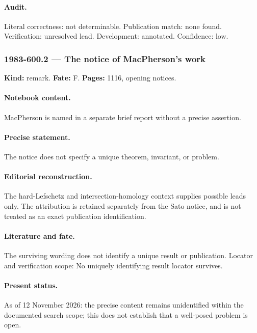 \paragraph{Audit.} Literal correctness: not determinable. Publication match: none found. Verification: unresolved lead. Development: annotated. Confidence: low.

\subsubsection{1983-600.2 --- The notice of MacPherson's work}

\label{item:1983-600.2}

\noindent\textbf{Kind:} remark. \textbf{Fate:} F. \textbf{Pages:} 1116, opening notices.\par

\paragraph{Notebook content.} MacPherson is named in a separate brief report without a precise assertion.

\paragraph{Precise statement.} The notice does not specify a unique theorem, invariant, or problem.

\paragraph{Editorial reconstruction.} The hard-Lefschetz and intersection-homology context supplies possible leads only. The attribution is retained separately from the Sato notice, and is not treated as an exact publication identification.

\paragraph{Literature and fate.} The surviving wording does not identify a unique result or publication. Locator and verification scope: No uniquely identifying result locator survives.

\paragraph{Present status.} As of 12 November 2026: the precise content remains unidentified within the documented search scope; this does not establish that a well-posed problem is open.

